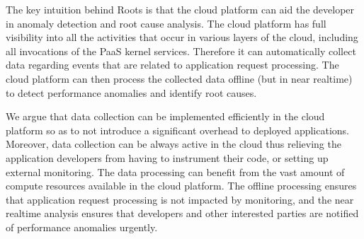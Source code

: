 The key intuition behind Roots is that
the cloud platform can aid the developer in anomaly detection and root cause analysis.
The cloud platform has full visibility into all the activities that occur in various layers of the cloud,
including all invocations of the PaaS kernel services. Therefore
it can automatically collect data regarding events that are related to application request processing. 
The cloud platform can then process the collected data offline (but in near realtime) to detect 
performance anomalies and identify root causes.

We argue that data collection can be implemented efficiently in the cloud platform so as to not
introduce a significant overhead to deployed applications.
Moreover, data collection can be always active in the cloud thus relieving the application developers
from having to instrument their code, or setting up external monitoring.
The data processing can benefit from the vast amount of compute
resources available in the cloud platform. The offline processing ensures that application request
processing is not impacted by monitoring, and the near realtime analysis ensures that developers
and other interested parties are notified of performance anomalies urgently. 